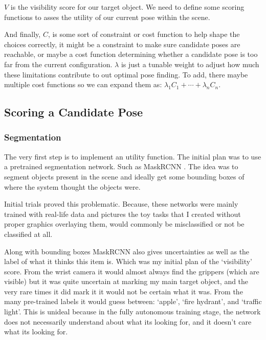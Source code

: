 $V$ is the visibility score for our target object. We need to define some scoring functions to asses the utility of our current pose within the scene.

And finally, $C$, is some sort of constraint or cost function to help shape the choices correctly, it might be a constraint to make sure candidate poses are reachable, or maybe a cost function determining whether a candidate pose is too far from the current configuration. $\lambda$ is just a tunable weight to adjust how much these limitations contribute to out optimal pose finding. To add, there maybe multiple cost functions so we can expand them as: \(\lambda_1 C_1 + \cdots +\lambda_n C_n \).


\subsection{Scoring a Candidate Pose}
\subsubsection{Segmentation}
The very first step is to implement an utility function. The initial plan was to use a pretrained segmentation network. Such as MaskRCNN \cite{he2018maskrcnn}. The idea was to segment objects present in the scene and ideally get some bounding boxes of where the system thought the objects were. 

Initial trials proved this problematic. Because, these networks were mainly trained with real-life data and pictures the toy tasks that I created without proper graphics overlaying them, would commonly be misclassified or not be classified at all. 

Along with bounding boxes MaskRCNN also gives uncertainties as well as the label of what it thinks this item is. Which was my initial plan of the `visibility' score. From the wrist camera it would almost always find the grippers (which are visible) but it was quite uncertain at marking my main target object, and the very rare times it did mark it it would not be certain what it was. From the many pre-trained labels it would guess between: `apple', `fire hydrant', and `traffic light'. This is unideal because in the fully autonomous training stage, the network does not necessarily understand about what its looking for, and it doesn't care what its looking for. 


